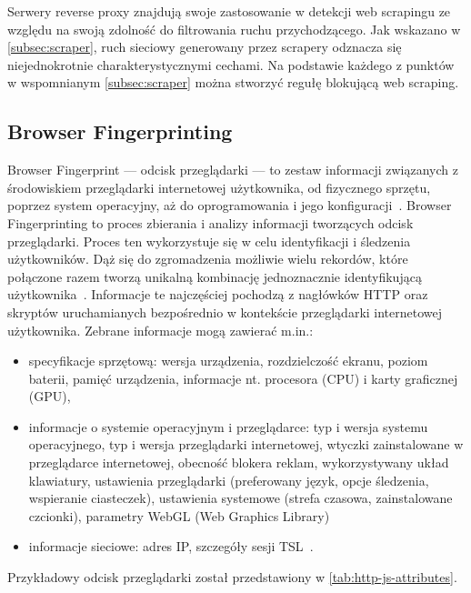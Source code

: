 Serwery reverse proxy znajdują swoje zastosowanie w detekcji web scrapingu ze względu na swoją zdolność do filtrowania ruchu przychodzącego.
Jak wskazano w \autoref{subsec:scraper}, ruch sieciowy generowany przez scrapery odznacza się niejednokrotnie charakterystycznymi cechami.
Na podstawie każdego z punktów w wspomnianym \autoref{subsec:scraper} można stworzyć regułę blokującą web scraping.

\newpage

\subsection{Browser Fingerprinting}\label{subsec:browser-fingerprinting}

Browser Fingerprint --- odcisk przeglądarki --- to zestaw informacji związanych z środowiskiem przeglądarki internetowej użytkownika, od fizycznego sprzętu, poprzez system operacyjny, aż do oprogramowania i jego konfiguracji~\cite{browser-fingerprinting-a-survey}.
Browser Fingerprinting to proces zbierania i analizy informacji tworzących odcisk przeglądarki.
Proces ten wykorzystuje się w celu identyfikacji i śledzenia użytkowników.
Dąż się do zgromadzenia możliwie wielu rekordów, które połączone razem tworzą unikalną kombinację jednoznacznie identyfikującą użytkownika~\cite{fingerprint-browser-fingerprinting}.
Informacje te najczęściej pochodzą z nagłówków HTTP oraz skryptów uruchamianych bezpośrednio w kontekście przeglądarki internetowej użytkownika.
Zebrane informacje mogą zawierać m.in.:
\begin{itemize}
    \item specyfikacje sprzętową: wersja urządzenia, rozdzielczość ekranu, poziom baterii, pamięć urządzenia, informacje nt. procesora (CPU) i karty graficznej (GPU),
    \item informacje o systemie operacyjnym i przeglądarce: typ i wersja systemu operacyjnego, typ i wersja przeglądarki internetowej, wtyczki zainstalowane w przeglądarce internetowej, obecność blokera reklam, wykorzystywany układ klawiatury, ustawienia przeglądarki (preferowany język, opcje śledzenia, wspieranie ciasteczek), ustawienia systemowe (strefa czasowa, zainstalowane czcionki), parametry WebGL (Web Graphics Library)
    \item informacje sieciowe: adres IP, szczegóły sesji TSL~\cite{browser-fingerprinting-a-survey,zitadel-browser-fingerprinting,zenrows-browser-fingerprinting,fingerprint-browser-fingerprinting}.
\end{itemize}
\noindent Przykładowy odcisk przeglądarki został przedstawiony w \autoref{tab:http-js-attributes}.

